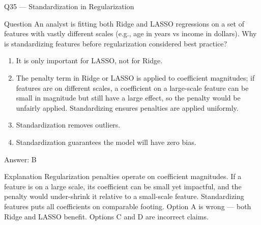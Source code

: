 \documentclass[aspectratio=169,8pt]{beamer}
\begin{document}
	\begin{frame}{Q35 --- Standardization in Regularization}
		\begin{block}{Question}
			An analyst is fitting both Ridge and LASSO regressions on a set of features with vastly different scales (e.g., age in years vs income in dollars). Why is standardizing features before regularization considered best practice?
		\end{block}
		\begin{enumerate}
			\item It is only important for LASSO, not for Ridge.
			\item The penalty term in Ridge or LASSO is applied to coefficient magnitudes; if features are on different scales, a coefficient on a large-scale feature can be small in magnitude but still have a large effect, so the penalty would be unfairly applied. Standardizing ensures penalties are applied uniformly.
			\item Standardization removes outliers.
			\item Standardization guarantees the model will have zero bias.
		\end{enumerate}
		\begin{exampleblock}{Answer: B}\end{exampleblock}
		\begin{block}{Explanation}
			Regularization penalties operate on coefficient magnitudes. If a feature is on a large scale, its coefficient can be small yet impactful, and the penalty would under-shrink it relative to a small-scale feature. Standardizing features puts all coefficients on comparable footing. Option A is wrong --- both Ridge and LASSO benefit. Options C and D are incorrect claims.
		\end{block}
	\end{frame}
	
\end{document}
